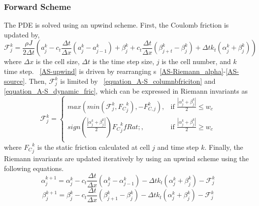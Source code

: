 \subsubsection{Forward Scheme}
The PDE is solved using an upwind scheme. First, the Coulomb friction is updated by,
\begin{equation}\label{AS-upwind}
  \mathcal{F}_{j}^k = \frac{\rho J}{2 \Delta t}\left(a_j^k - c_t \frac{\Delta t}{\Delta x}(a_j^k - a_{j-1}^k) + \beta_j^k + c_t \frac{\Delta t}{\Delta x}(\beta_{j+t}^k-\beta_j^k) + \Delta t k_t (\alpha_j^k + \beta_j^k)\right)
\end{equation}
where $\Delta x$ is the cell size, $\Delta t$ is the time step size, $j$ is the cell number, and $k$ time step.  \equationname~\ref{AS-upwind} is driven by rearranging \equationname{}s~\ref{AS-Riemann_alpha}-\ref{AS-source}. Then, $\mathcal{F}_{j}^k$ is limited by \equationname~\ref{equation_A-S_columnbfriciton} and \ref{equation_A-S_dynamic_fric}, which can be expressed in Riemann invariants as
\begin{equation}\label{equation_A-S_columnbfriciton_Riemann}
\mathcal{F}_{j}^k =
  \begin{cases}
      max(min(\mathcal{F}_{j}^k,{F_C}_j^k),-F_{C,j}^k) , & \mbox{if } \frac{|\alpha_j^k + \beta_j^k|}{2} \le w_c \\
      sign(\frac{|\alpha_j^k + \beta_j^k|}{2}){F_C}_j^k fRat; , & \mbox{if } \frac{|\alpha_j^k + \beta_j^k|}{2} \ge w_c \\
  \end{cases}
\end{equation}
where ${F_C}_j^k$ is the static friction calculated at cell $j$ and time step $k$. Finally, the Riemann invariants are updated iteratively by using an upwind scheme using the following equations.
\begin{equation}\label{equation_upwind_alpha}
  \alpha_j^{k+1} = \alpha_j^{k} - c_t \frac{\Delta t}{\Delta x}(\alpha_j^k - \alpha_{j-1}^k) - \Delta t k_t (\alpha_j^k + \beta_j^k) - \mathcal{F}_j^k
\end{equation}
\begin{equation}\label{equation_upwind_beta}
  \beta_j^{k+1} = \beta_j^{k} - c_t \frac{\Delta t}{\Delta x}(\beta_{j+1}^k - \beta_{j}^k) - \Delta t k_t (\alpha_j^k + \beta_j^k) - \mathcal{F}_j^k
\end{equation}


